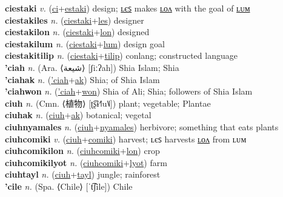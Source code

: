 \textbf{ciestaki} \textit{v.} (\hyperref[ci]{ci}+\hyperref[estaki]{estaki})
design; \hyperref[ciestakiles]{ʟєꜱ} makes \hyperref[ciestakilon]{ʟᴏᴧ} with the goal of \hyperref[ciestakilum]{ʟᴜᴍ} \label{ciestaki} \\
\textbf{ciestakiles} \textit{n.} (\hyperref[ciestaki]{ciestaki}+\hyperref[les]{les})
designer \label{ciestakiles} \\
\textbf{ciestakilon} \textit{n.} (\hyperref[ciestaki]{ciestaki}+\hyperref[lon]{lon})
designed \label{ciestakilon} \\
\textbf{ciestakilum} \textit{n.} (\hyperref[ciestaki]{ciestaki}+\hyperref[lum]{lum})
design goal \label{ciestakilum} \\
\textbf{ciestakitilip} \textit{n.} (\hyperref[ciestaki]{ciestaki}+\hyperref[tilip]{tilip})
conlang; constructed language \label{ciestakitilip} \\
\textbf{'ciah} \textit{n.} (Ara. ⟨شيعة‎⟩ [ʃiːʔah])
Shia Islam; Shia \label{'ciah} \\
\textbf{'ciahak} \textit{n.} (\hyperref['ciah]{'ciah}+\hyperref[ak]{ak})
Shia; of Shia Islam \label{'ciahak} \\
\textbf{'ciahwon} \textit{n.} (\hyperref['ciah]{'ciah}+\hyperref[won]{won})
Shia of Ali; Shia; followers of Shia Islam \label{'ciahwon} \\
\textbf{ciuh} \textit{n.} (Cmn. ⟨植物⟩ [ʈ͡ʂɨ˧˥u˥˩])
plant; vegetable; Plantae \label{ciuh} \\
\textbf{ciuhak} \textit{n.} (\hyperref[ciuh]{ciuh}+\hyperref[ak]{ak})
botanical; vegetal \label{ciuhak} \\
\textbf{ciuhnyamales} \textit{n.} (\hyperref[ciuh]{ciuh}+\hyperref[nyamales]{nyamales})
herbivore; something that eats plants \label{ciuhnyamales} \\
\textbf{ciuhcomiki} \textit{v.} (\hyperref[ciuh]{ciuh}+\hyperref[comiki]{comiki})
harvest; ʟєꜱ harvests \hyperref[ciuhcomikilon]{ʟᴏᴧ} from ʟᴜᴍ \label{ciuhcomiki} \\
\textbf{ciuhcomikilon} \textit{n.} (\hyperref[ciuhcomiki]{ciuhcomiki}+\hyperref[lon]{lon})
crop \label{ciuhcomikilon} \\
\textbf{ciuhcomikilyot} \textit{n.} (\hyperref[ciuhcomiki]{ciuhcomiki}+\hyperref[lyot]{lyot})
farm \label{ciuhcomikilyot} \\
\textbf{ciuhtayl} \textit{n.} (\hyperref[ciuh]{ciuh}+\hyperref[tayl]{tayl})
jungle; rainforest \label{ciuhtayl} \\
\textbf{'cile} \textit{n.} (Spa. ⟨Chile⟩ [ˈt͡ʃile])
Chile \label{'cile} \\
